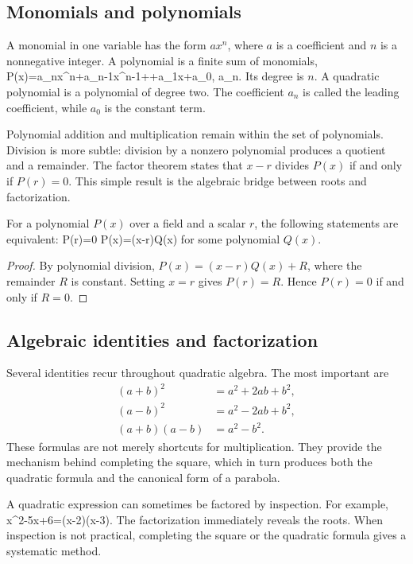 \subsection{Monomials and polynomials}

A monomial in one variable has the form $a x^n$, where $a$ is a coefficient and $n$ is a nonnegative integer. A polynomial is a finite sum of monomials,
\be
P(x)=a_nx^n+a_{n-1}x^{n-1}+\cdots+a_1x+a_0,
\qquad a_n.
\ee
Its degree is $n$. A quadratic polynomial is a polynomial of degree two. The coefficient $a_n$ is called the leading coefficient, while $a_0$ is the constant term.

Polynomial addition and multiplication remain within the set of polynomials. Division is more subtle: division by a nonzero polynomial produces a quotient and a remainder. The factor theorem states that $x-r$ divides $P(x)$ if and only if $P(r)=0$. This simple result is the algebraic bridge between roots and factorization.

\begin{theorem}
For a polynomial $P(x)$ over a field and a scalar $r$, the following statements are equivalent:
\be
P(r)=0
\qquad\Longleftrightarrow\qquad
P(x)=(x-r)Q(x)
\ee
for some polynomial $Q(x)$.
\end{theorem}

\begin{proof}
By polynomial division, $P(x)=(x-r)Q(x)+R$, where the remainder $R$ is constant. Setting $x=r$ gives $P(r)=R$. Hence $P(r)=0$ if and only if $R=0$.
\end{proof}

\subsection{Algebraic identities and factorization}

Several identities recur throughout quadratic algebra. The most important are
\bse
\begin{align}
(a+b)^2 &= a^2+2ab+b^2,\\
(a-b)^2 &= a^2-2ab+b^2,\\
(a+b)(a-b) &= a^2-b^2.
\end{align}
\ese
These formulas are not merely shortcuts for multiplication. They provide the mechanism behind completing the square, which in turn produces both the quadratic formula and the canonical form of a parabola.

A quadratic expression can sometimes be factored by inspection. For example,
\be
x^2-5x+6=(x-2)(x-3).
\ee
The factorization immediately reveals the roots. When inspection is not practical, completing the square or the quadratic formula gives a systematic method.

